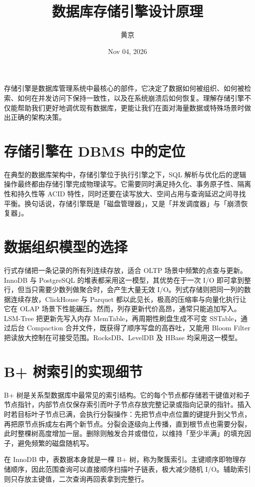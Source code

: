 \title{数据库存储引擎设计原理}
\author{黄京}
\date{Nov 04, 2026}
\maketitle
存储引擎是数据库管理系统中最核心的部件，它决定了数据如何被组织、如何被检索、如何在并发访问下保持一致性，以及在系统崩溃后如何恢复。理解存储引擎不仅能帮助我们更好地调优现有数据库，更能让我们在面对海量数据或特殊场景时做出正确的架构决策。\par
\chapter{存储引擎在 DBMS 中的定位}
在典型的数据库架构中，存储引擎位于执行引擎之下，SQL 解析与优化后的逻辑操作最终都由存储引擎完成物理读写。它需要同时满足持久化、事务原子性、隔离性和持久性等 ACID 特性，同时还要在读写放大、空间占用与查询延迟之间寻找平衡。换句话说，存储引擎既是「磁盘管理器」，又是「并发调度器」与「崩溃恢复器」。\par
\chapter{数据组织模型的选择}
行式存储把一条记录的所有列连续存放，适合 OLTP 场景中频繁的点查与更新。InnoDB 与 PostgreSQL 的堆表都采用这一模型，其优势在于一次 I/O 即可拿到整行，但当只需要少数列做聚合时，会产生大量无效 I/O。列式存储则把同一列的数据连续存放，ClickHouse 与 Parquet 都以此见长，极高的压缩率与向量化执行让它在 OLAP 场景下性能碾压。然而，列存更新代价高昂，通常只能追加写入。LSM-Tree 把更新先写入内存 MemTable，再周期性刷盘生成不可变 SSTable，通过后台 Compaction 合并文件，既获得了顺序写盘的高吞吐，又能用 Bloom Filter 把读放大控制在可接受范围。RocksDB、LevelDB 及 HBase 均采用这一模型。\par
\chapter{B+ 树索引的实现细节}
B+ 树是关系型数据库中最常见的索引结构。它的每个节点都存储若干键值对和子节点指针，内部节点仅保存索引而叶子节点存放完整记录或指向记录的指针。插入时若目标叶子节点已满，会执行分裂操作：先把节点中点位置的键提升到父节点，再把原节点拆成左右两个新节点。分裂会逐级向上传播，直到根节点也需要分裂，此时整棵树高度增加一层。删除则触发合并或借位，以维持「至少半满」的填充因子，避免频繁的磁盘随机写。\par
在 InnoDB 中，表数据本身就是一棵 B+ 树，称为聚簇索引。主键顺序即物理存储顺序，因此范围查询可以直接顺序扫描叶子链表，极大减少随机 I/O。辅助索引则只存放主键值，二次查询再回表拿到完整行。\par
